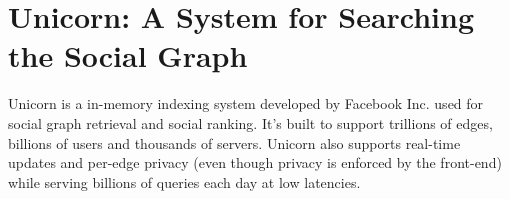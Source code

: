 \documentclass{article}
\begin{document}
\section{Unicorn: A System for Searching the Social Graph}

Unicorn is a in-memory indexing system developed by Facebook Inc. used for social graph retrieval and social ranking. It's built to support trillions of edges, billions of users and thousands of servers. Unicorn also supports real-time updates and per-edge privacy (even though privacy is enforced by the front-end) while serving billions of queries each day at low latencies.
\end{document}

